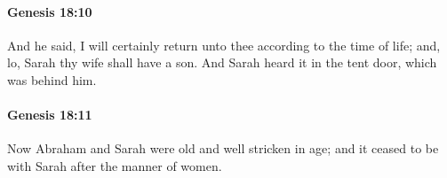 		\paragraph{Genesis 18:10} %
			\label{GENESIS-18-10}

			And he said, I will certainly return unto thee according to the time of life; and, lo, Sarah thy wife shall have a son. And Sarah heard it in the tent door, which was behind him.


		\paragraph{Genesis 18:11} %
			\label{GENESIS-18-11}

			Now Abraham and Sarah were old and well stricken in age; and it ceased to be with Sarah after the manner of women.


